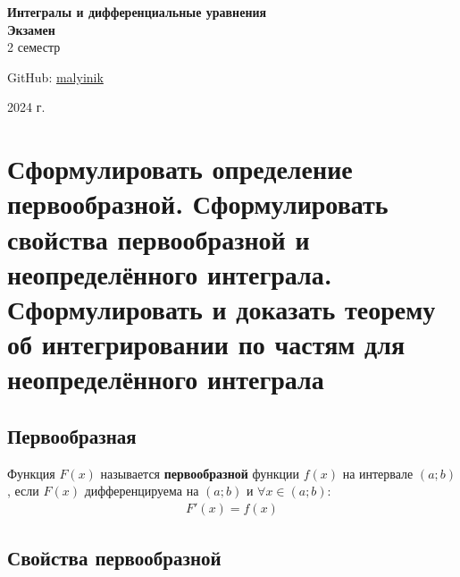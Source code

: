 



\begin{titlepage}
    \vspace*{0pt}
    \vfill
    \centering
    \Huge\textbf{Интегралы и дифференциальные уравнения} \\[7pt]
    \Large\textbf{Экзамен} \\
    \large 2 семестр \\ 
    \vfill
    \begin{flushright}
        \normalsize GitHub: \href{https://github.com/malyinik}{malyinik} \\
    \end{flushright}
    \normalsize 2024 г.
\end{titlepage}
\newpage

\tableofcontents
\newpage

\section{Сформулировать определение первообразной. Сформулировать свойства первообразной и неопределённого интеграла. Сформулировать и доказать теорему об интегрировании по частям для неопределённого интеграла} 

\subsection*{Первообразная}
\begin{definition}
    Функция $F(x)$ называется \textbf{первообразной} функции $f(x)$ на интервале $(a;b)$, если $F(x)$ дифференцируема на $(a;b)$ и $\forall x \in (a;b)\colon$
    \begin{gather}
        \boxed{F'(x) = f(x)}
    \end{gather}
\end{definition}

\subsection*{Свойства первообразной}

